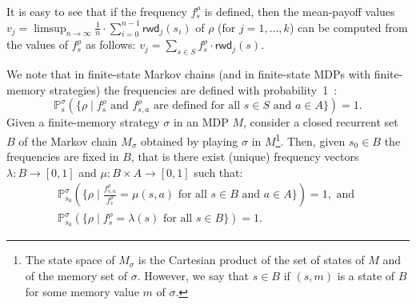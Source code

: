 \documentclass{article}
\newcommand{\straa}{\sigma}
\newcommand{\prob}[1]{\mathbb{P}_{#1}}
\newcommand{\rwd}{\mathsf{rwd}}
\begin{document}
\smallskip{}
It is easy to see that if the frequency $f_s^\rho$ is defined, then 
the mean-payoff values $v_j = \limsup_{n \to \infty} \frac{1}{n} \cdot \sum_{i = 0}^{n-1}\rwd_j(s_{i})$
of $\rho$ (for $j=1,\ldots,k$) can be computed from the values of $f_s^\rho$
as follows: $v_j = \sum_{s \in S} f_s^\rho \cdot \rwd_j(s)$.

\smallskip{}
We note that in finite-state Markov chains (and in finite-state MDPs with finite-memory
strategies) the frequencies are defined with probability~1~\cite{FV97}:
$$\prob{s}^{\straa}(\{\rho \mid f_s^\rho \text{ and } f_{s,a}^\rho \text{ are defined for all } s \in S \text{ and } a \in A \}) = 1.$$
Given a finite-memory strategy $\straa$ in an MDP $M$, consider a closed recurrent set $B$
of the Markov chain $M_{\straa}$ obtained by playing $\straa$ in 
$M$\footnote{The state space of $M_{\straa}$ is the Cartesian product of the set
of states of $M$ and of the memory set of $\straa$. However, 
we say that $s \in B$ if $(s,m)$ is a state of $B$ for some memory value $m$ of $\straa$.}. 
Then, given $s_0 \in B$ the frequencies are fixed in $B$, that is there exist (unique) frequency 
vectors $\lambda: B \to [0,1]$ and $\mu: B \times A \to [0,1]$ such that:
$$
\begin{array}{l}
\prob{s_0}^{\straa}(\{\rho \mid \frac{f_{s,a}^\rho}{f_s^\rho} = \mu(s,a) \text{ for all } s \in B \text{ and } a \in A \}) = 1, \text{ and } \\[+3pt]
\prob{s_0}^{\straa}(\{\rho \mid f_s^\rho = \lambda(s) \text{ for all } s \in B \}) = 1.
\end{array}
$$
\end{document}
